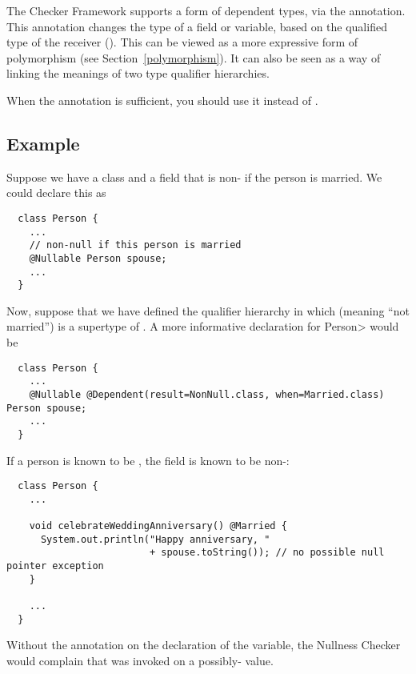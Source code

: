 The Checker Framework supports a form of dependent types, via the
 annotation.
This annotation changes the type of a field or variable, based on the
qualified type of the receiver ().  This can be viewed as a more
expressive form of polymorphism (see Section~\ref{polymorphism}).  It can
also be seen as a way of linking the meanings of two type qualifier
hierarchies.

When the  annotation is sufficient, you
should use it instead of .


\subsection{Example\label{dependent-types-example}}

Suppose we have a class  and a field  that is
non- if the person is married.  We could declare this as

\begin{Verbatim}
  class Person {
    ...
    // non-null if this person is married
    @Nullable Person spouse;
    ...
  }
\end{Verbatim}

Now, suppose that we have defined the qualifier hierarchy in which
 (meaning ``not married'') is a supertype of .
A more informative declaration for \<Person> would be

\begin{Verbatim}
  class Person {
    ...
    @Nullable @Dependent(result=NonNull.class, when=Married.class) Person spouse;
    ...
  }
\end{Verbatim}

If a person is known to be , the
 field is known to be non-:

\begin{Verbatim}
  class Person {
    ...

    void celebrateWeddingAnniversary() @Married {
      System.out.println("Happy anniversary, "
                         + spouse.toString()); // no possible null pointer exception
    }

    ...
  }
\end{Verbatim}

\noindent
Without the  annotation on the
declaration of the  variable, the Nullness Checker would
complain that  was invoked on a possibly-
value.

